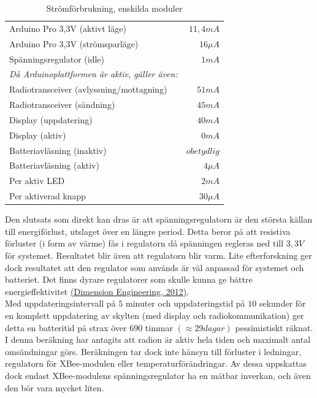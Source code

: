 \documentclass[a4paper,11pt]{article}
\begin{document}
\begin{table}[h]
\centering
	\begin{tabular}{|l|r|}
	Arduino Pro 3,3V (aktivt läge) & {$11,4 mA$}\\
	Arduino Pro 3,3V (strömsparläge) & {$16 {\mu}A$}\\
	Spänningsregulator (idle) & {$1 mA$}\\
	{\it Då Arduinoplattformen är aktiv, gäller även:} & { }\\	
	Radiotransceiver (avlyssning/mottagning) & {$51 mA$}\\
	Radiotransceiver (sändning) & {$45 mA$}\\
	Display (uppdatering) & {$40 mA$}\\
	Display (aktiv) &  {$0 mA$}\\
	Batteriavläsning (inaktiv) & {$obetydlig$}\\
	Batteriavläsning (aktiv) & {$4 {\mu}A$}\\
	Per aktiv LED & {$2 mA$}\\
	Per aktiverad knapp & {$30 {\mu}A$}\\
	\end{tabular}
\caption{Strömförbrukning, enskilda moduler}
\label{tab:currentdrawtable}
\end{table}

Den slutsats som direkt kan dras är att spänningsregulatorn är den största källan till energiförlust, utslaget över en längre period. Detta beror på att resistiva förluster (i form av värme) fås i regulatorn då spänningen regleras ned till $3,3V$ för systemet. Resultatet blir även att regulatorn blir varm. Lite efterforskning ger dock resultatet att den regulator som används är väl anpassad för systemet och batteriet. Det finns dyrare regulatorer som skulle kunna ge bättre energieffektivitet \hyperref[dimension]{(Dimension Engineering, 2012)}.\\

Med uppdateringsintervall på $5$ minuter och uppdateringstid på $10$ sekunder för en komplett uppdatering av skylten (med display och radiokommunikation) ger detta en batteritid på strax över $690$ timmar $(\approx 29 dagar)$ pessimistiskt räknat. I denna beräkning har antagits att radion är aktiv hela tiden och maximalt antal omsändningar görs. Beräkningen tar dock inte hänsyn till förluster i ledningar, regulatorn för XBee-modulen eller temperaturförändringar. Av dessa uppskattas dock endast XBee-modulens spänningsregulator ha en mätbar inverkan, och även den bör vara mycket liten. \\
\end{document}

